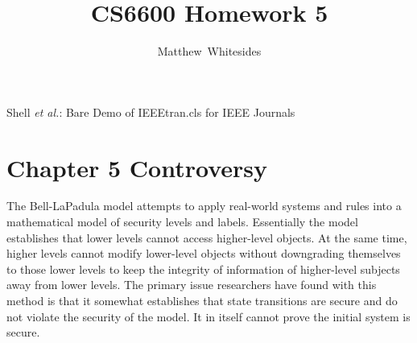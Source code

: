 \documentclass[journal,onecolumn]{IEEEtran}
\begin{document}
%
\title{CS6600 Homework 5}

%
%
%
\author{Matthew~Whitesides}%

%
{Shell \MakeLowercase{\textit{et al.}}: Bare Demo of IEEEtran.cls for IEEE Journals}

\maketitle


\IEEEpeerreviewmaketitle

\section{Chapter 5 Controversy} 

The Bell-LaPadula model attempts to apply real-world systems and rules into a mathematical model of security levels and labels. Essentially the model establishes that lower levels cannot access higher-level objects. At the same time, higher levels cannot modify lower-level objects without downgrading themselves to those lower levels to keep the integrity of information of higher-level subjects away from lower levels. The primary issue researchers have found with this method is that it somewhat establishes that state transitions are secure and do not violate the security of the model. It in itself cannot prove the initial system is secure. 
\end{document}
